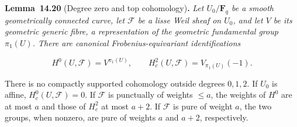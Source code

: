 \documentclass[11pt]{article}
\newenvironment{bpstatement}[2]{\par\addvspace{0.6\baselineskip}\noindent\textbf{#1}#2\textbf{.}\enspace\ignorespaces}
  {\par\addvspace{0.4\baselineskip}}
\newenvironment{bpstatementit}[2]{\begin{bpstatement}{#1}{#2}\itshape\ignorespaces}{\end{bpstatement}}
\begin{document}
\label{bp66}%
\begin{bpstatementit}{Lemma~14.20}{ (Degree zero and top cohomology)}
Let \(U_0/\mathbf F_q\) be a smooth geometrically connected curve, let \(\mathcal F\) be a lisse Weil sheaf on \(U_0\), and let \(V\) be its geometric generic fibre, a representation of the geometric fundamental group \(\pi_1(U)\).  There are canonical Frobenius-equivariant identifications

\[
H^0(U,\mathcal F)=V^{\pi_1(U)},\qquad
H_c^2(U,\mathcal F)=V_{\pi_1(U)}(-1).
\]

There is no compactly supported cohomology outside degrees \(0,1,2\). If \(U_0\) is affine, \(H_c^0(U,\mathcal F)=0\). If \(\mathcal F\) is punctually of weights \(\le a\), the weights of \(H^0\) are at most \(a\) and those of \(H_c^2\) at most \(a+2\).  If \(\mathcal F\) is pure of weight \(a\), the two groups, when nonzero, are pure of weights \(a\) and \(a+2\), respectively.
\end{bpstatementit}
\end{document}
